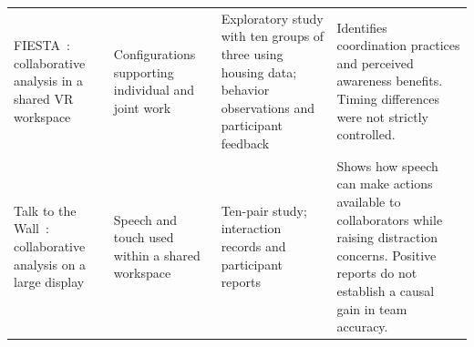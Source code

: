 \begin{table}[t]
\begin{tabular}{@{}>{\raggedright\arraybackslash}p{}>{\raggedright\arraybackslash}p{}>{\raggedright\arraybackslash}p{}>{\raggedright\arraybackslash}p{}@{}}
\addlinespace[3pt]

FIESTA~\cite{EvalLee2021}: collaborative analysis in a shared VR workspace & Configurations supporting individual and joint work & Exploratory study with ten groups of three using housing data; behavior observations and participant feedback & Identifies coordination practices and perceived awareness benefits. Timing differences were not strictly controlled. \\

\addlinespace[3pt]

Talk to the Wall~\cite{EvalMolinaLeon2025}: collaborative analysis on a large display & Speech and touch used within a shared workspace & Ten-pair study; interaction records and participant reports & Shows how speech can make actions available to collaborators while raising distraction concerns. Positive reports do not establish a causal gain in team accuracy. \\

\bottomrule

\end{tabular}

\end{table}

